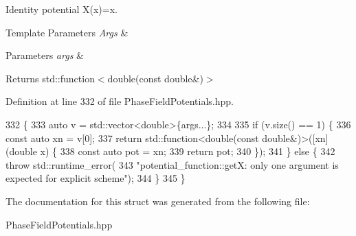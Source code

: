 Identity potential X(x)=x. 


\begin{DoxyTemplParams}{Template Parameters}
{\em Args} & \\
\hline
\end{DoxyTemplParams}

\begin{DoxyParams}{Parameters}
{\em args} & \\
\hline
\end{DoxyParams}
\begin{DoxyReturn}{Returns}
std\+::function$<$double(const double\&)$>$ 
\end{DoxyReturn}


Definition at line 332 of file Phase\+Field\+Potentials.\+hpp.


\begin{DoxyCode}
332                                                         \{
333     \textcolor{keyword}{auto} v = std::vector<double>\{args...\};
334 
335     \textcolor{keywordflow}{if} (v.size() == 1) \{
336       \textcolor{keyword}{const} \textcolor{keyword}{auto} xn = v[0];
337       \textcolor{keywordflow}{return} std::function<double(const double&)>([xn](\textcolor{keywordtype}{double} x) \{
338         \textcolor{keyword}{const} \textcolor{keyword}{auto} pot = xn;
339         \textcolor{keywordflow}{return} pot;
340       \});
341     \} \textcolor{keywordflow}{else} \{
342       \textcolor{keywordflow}{throw} std::runtime\_error(
343           \textcolor{stringliteral}{"potential\_function::getX: only one argument is expected for explicit scheme"});
344     \}
345   \}
\end{DoxyCode}


The documentation for this struct was generated from the following file\+:\begin{DoxyCompactItemize}
\item 
Phase\+Field\+Potentials.\+hpp\end{DoxyCompactItemize}
